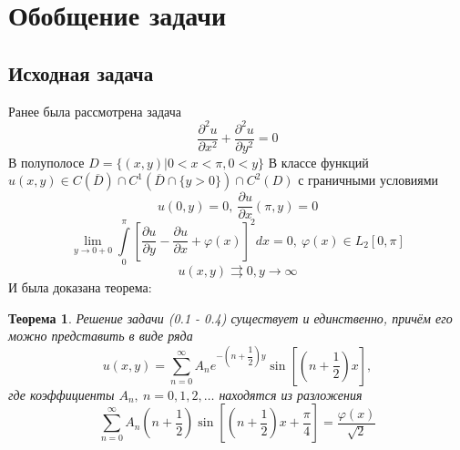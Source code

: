\documentclass[10pt, a4paper]{extarticle}
\newtheorem{theorem}{Теорема}
\numberwithin{equation}{section}
\numberwithin{lemma}{section}
\numberwithin{definition}{section}
\numberwithin{notabene}{section}
\numberwithin{corollary}{section}
\begin{document}
	\section*{Обобщение задачи}
	\subsection*{Исходная задача}
		Ранее была рассмотрена задача
	\begin{equation}
		\dfrac{\partial^2 u}{\partial x^2} +\dfrac{\partial^2 u}{\partial y^2} = 0
	\end{equation}
	В полуполосе $D = \{(x,y) \vert 0 < x < \pi, 0 < y\}$\newline
	В классе функций $u(x,y) \in C(\overline{D}) \cap C^1(\overline{D} \cap \{y > 0\}) \cap C^2 (D)$ \newline
	с граничными условиями
	\begin{equation}
		u(0, y) = 0, \ \dfrac{\partial u}{\partial x} (\pi, y) = 0
	\end{equation}
	\begin{equation}
		\lim\limits_{y \to 0 + 0} \int\limits_0^\pi \left[\dfrac{\partial u}{\partial y} - \dfrac{\partial u}{\partial x} + \varphi(x) \right]^2 dx = 0, \ \varphi(x) \in L_2[0,\pi]
	\end{equation}
	\begin{equation}
		u(x,y) \rightrightarrows 0, y \to \infty
	\end{equation}
	И была доказана теорема:
	\begin{theorem}
		Решение задачи (0.1 - 0.4) существует и единственно, причём его можно представить в виде ряда
		\begin{equation}
			u(x,y) = \sum\limits_{n=0}^{\infty} A_n e^{-\left(n + \dfrac12\right)y} \sin{\left[\left(n + \dfrac12\right)x\right]},
		\end{equation}
		где коэффициенты $A_n, \ n =0,1,2, \dots$ находятся из разложения
		\begin{equation}
			\sum\limits_{n=0}^{\infty} A_n \left(n + \dfrac12 \right) \sin{\left[\left(n +\dfrac12\right)x + \dfrac\pi4\right]} = \dfrac{\varphi(x)}{\sqrt2}
		\end{equation}
	\end{theorem}	
	\newpage
\end{document}
